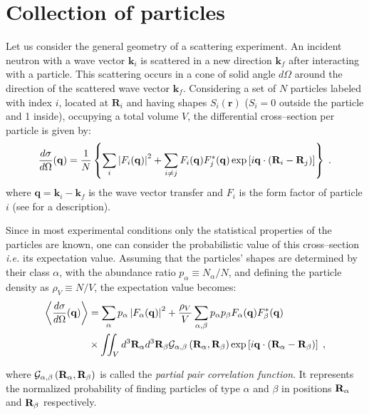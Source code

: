 \section{Collection of particles} 

Let us consider the general geometry of a scattering experiment. An incident neutron with a wave vector $\mathbf{k}_i$ is scattered in a new direction $\mathbf{k}_f$ after interacting with a particle. This scattering occurs in a cone of solid angle $d\Omega$ around the direction of the scattered wave vector $\mathbf{k}_f$.
Considering a set of $N$ particles labeled with index $i$, located at $\mathbf{R}_i$ and having shapes $S_i(\mathbf{r})$ ($S_i=0$ outside the particle and 1 inside), occupying a total volume $V$, the differential cross--section per particle is given by:
\begin{equation*}
  \frac{d\sigma}{d\Omega}(\mathbf{q}) = \frac{1}{N}\left\lbrace \sum_i \left\lvert F_i(\mathbf{q}) \right\rvert ^2 + \sum_{i\neq j} F_i(\mathbf{q}) F_{j}^*(\mathbf{q}) \exp \left[i\mathbf{q}\cdot (\mathbf{R}_i-\mathbf{R}_j)\right] \right\rbrace \; .
\end{equation*}
where  $\mathbf{q}=\mathbf{k}_i - \mathbf{k}_f$ is the wave vector transfer and $F_i$ is the form factor of particle $i$ (see  for a description).


Since in most experimental conditions only the statistical properties of the particles are known, one can consider the probabilistic value of this cross--section \textit{i.e.} its expectation value. Assuming that the particles' shapes are determined by their class $\alpha$, with the abundance ratio $p_\alpha \equiv N_\alpha / N$, and defining the particle density as $\rho_V \equiv N/V$, the expectation value becomes:
\begin{align*}
  \left\langle \frac{d\sigma}{d\Omega}(\mathbf{q}) \right\rangle  & = \sum_\alpha p_\alpha \left\lvert F_\alpha(\mathbf{q})\right\rvert ^2 + \frac{\rho_V}{V}\sum_{\alpha,\beta} p_\alpha p_\beta F_\alpha (\mathbf{q})F_\beta^*(\mathbf{q})  \\
  & \times \iint_V d^3\mathbf{R}_\alpha d^3\mathbf{R}_\beta \mathcal{G}_{\alpha ,\beta}\left( \mathbf{R}_{\alpha} , \mathbf{R}_{\beta} \right) \exp \left[ i\mathbf{q}\cdot (\mathbf{R}_\alpha - \mathbf{R}_\beta ) \right] \; ,
\end{align*}

where $\mathcal{G}_{\alpha ,\beta}\left( \mathbf{R}_{\alpha} , \mathbf{R}_{\beta} \right)$ is called the \emph{partial pair correlation function}. It represents the normalized probability of finding particles of type $\alpha$ and $\beta$ in positions $\mathbf{R}_\alpha$ and $\mathbf{R}_\beta$ respectively. 

